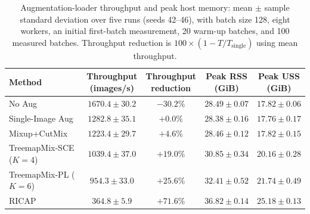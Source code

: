 \begin{table}[!htbp]
  \caption{Augmentation-loader throughput and peak host memory: mean $\pm$ sample standard deviation over five runs (seeds 42--46), with batch size 128, eight workers, an initial first-batch measurement, 20 warm-up batches, and 100 measured batches. Throughput reduction is $100\times(1-T/T_{\mathrm{single}})$ using mean throughput.}
  \label{tab:augmentation-loader-runtime}
  \centering
  \footnotesize
  \setlength{\tabcolsep}{4pt}
  \begin{tabular}{@{}lcccc@{}}
    \toprule
    Method & \makecell{Throughput\\(images/s)} & \makecell{Throughput\\reduction} & \makecell{Peak RSS\\(GiB)} & \makecell{Peak USS\\(GiB)} \\
    \midrule
    No Aug & $1670.4 \pm 30.2$ & $-30.2\%$ & $28.49 \pm 0.07$ & $17.82 \pm 0.06$ \\
    Single-Image Aug & $1282.8 \pm 35.1$ & $+0.0\%$ & $28.38 \pm 0.16$ & $17.76 \pm 0.17$ \\
    Mixup+CutMix & $1223.4 \pm 29.7$ & $+4.6\%$ & $28.46 \pm 0.12$ & $17.82 \pm 0.15$ \\
    TreemapMix-SCE ($K=4$) & $1039.4 \pm 37.0$ & $+19.0\%$ & $30.85 \pm 0.34$ & $20.16 \pm 0.28$ \\
    TreemapMix-PL ($K=6$) & $954.3 \pm 33.0$ & $+25.6\%$ & $32.41 \pm 0.52$ & $21.74 \pm 0.49$ \\
    RICAP & $364.8 \pm 5.9$ & $+71.6\%$ & $36.82 \pm 0.14$ & $25.18 \pm 0.13$ \\
    \bottomrule
  \end{tabular}
\end{table}
